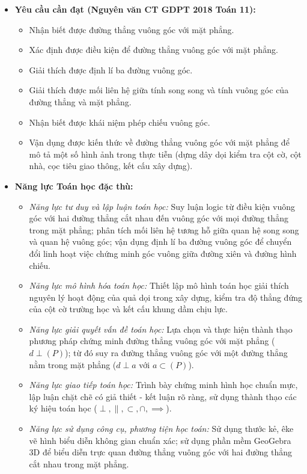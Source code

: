 \documentclass[12pt, a4paper]{article}
\begin{document}
\begin{itemize}[leftmargin=1.2cm]
    \item \textbf{Yêu cầu cần đạt (Nguyên văn CT GDPT 2018 Toán 11):}
    \begin{itemize}[leftmargin=0.6cm]
        \item Nhận biết được đường thẳng vuông góc với mặt phẳng.
        \item Xác định được điều kiện để đường thẳng vuông góc với mặt phẳng.
        \item Giải thích được định lí ba đường vuông góc.
        \item Giải thích được mối liên hệ giữa tính song song và tính vuông góc của đường thẳng và mặt phẳng.
        \item Nhận biết được khái niệm phép chiếu vuông góc.
        \item Vận dụng được kiến thức về đường thẳng vuông góc với mặt phẳng để mô tả một số hình ảnh trong thực tiễn (dựng dây dọi kiểm tra cột cờ, cột nhà, cọc tiêu giao thông, kết cấu xây dựng).
    \end{itemize}

    \item \textbf{Năng lực Toán học đặc thù:}
    \begin{itemize}[leftmargin=0.6cm]
        \item \textit{Năng lực tư duy và lập luận toán học:} Suy luận logic từ điều kiện vuông góc với hai đường thẳng cắt nhau đến vuông góc với mọi đường thẳng trong mặt phẳng; phân tích mối liên hệ tương hỗ giữa quan hệ song song và quan hệ vuông góc; vận dụng định lí ba đường vuông góc để chuyển đổi linh hoạt việc chứng minh góc vuông giữa đường xiên và đường hình chiếu.
        \item \textit{Năng lực mô hình hóa toán học:} Thiết lập mô hình toán học giải thích nguyên lý hoạt động của quả dọi trong xây dựng, kiểm tra độ thẳng đứng của cột cờ trường học và kết cấu khung dầm chịu lực.
        \item \textit{Năng lực giải quyết vấn đề toán học:} Lựa chọn và thực hiện thành thạo phương pháp chứng minh đường thẳng vuông góc với mặt phẳng ($d \perp (P)$); từ đó suy ra đường thẳng vuông góc với một đường thẳng nằm trong mặt phẳng ($d \perp a$ với $a \subset (P)$).
        \item \textit{Năng lực giao tiếp toán học:} Trình bày chứng minh hình học chuẩn mực, lập luận chặt chẽ có giả thiết - kết luận rõ ràng, sử dụng thành thạo các ký hiệu toán học ($\perp, \parallel, \subset, \cap, \implies$).
        \item \textit{Năng lực sử dụng công cụ, phương tiện học toán:} Sử dụng thước kẻ, êke vẽ hình biểu diễn không gian chuẩn xác; sử dụng phần mềm GeoGebra 3D để biểu diễn trực quan đường thẳng vuông góc với hai đường thẳng cắt nhau trong mặt phẳng.
    \end{itemize}


\end{itemize}
\end{document}
